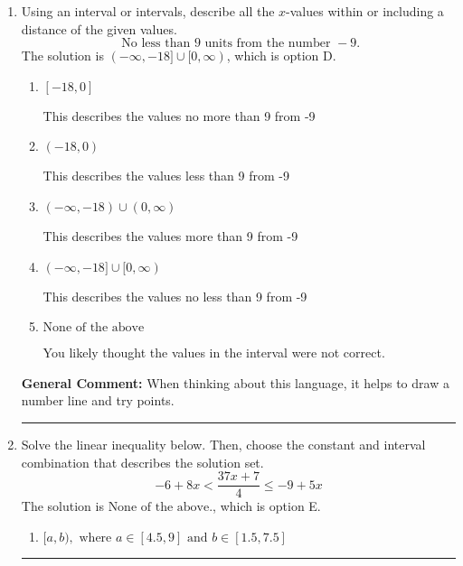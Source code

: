 \documentclass{extbook}[14pt]
\newcommand{\litem}[1]{\item #1

\rule{\textwidth}{0.4pt}}
\begin{document}
\begin{enumerate}
{\begin{enumerate}[label=\Alph*.]
$(-\infty, 10.00) \cup [-4.00, \infty)$, which corresponds to displaying the and-inequality as an or-inequality and getting negatives of the actual endpoints.
\item \( (-\infty, a] \cup (b, \infty), \text{ where } a \in [6.75, 15] \text{ and } b \in [-9.75, -1.5] \)

$(-\infty, 10.00] \cup (-4.00, \infty)$, which corresponds to displaying the and-inequality as an or-inequality AND flipping the inequality AND getting negatives of the actual endpoints.
\item \( (a, b], \text{ where } a \in [8.25, 15] \text{ and } b \in [-6, -3] \)

$(10.00, -4.00]$, which is the correct interval but negatives of the actual endpoints.
\item \( \text{None of the above.} \)

* This is correct as the answer should be $(-10.00, 4.00]$.
\end{enumerate}

\textbf{General Comment:} To solve, you will need to break up the compound inequality into two inequalities. Be sure to keep track of the inequality! It may be best to draw a number line and graph your solution.
}
\litem{
Using an interval or intervals, describe all the $x$-values within or including a distance of the given values.
\[ \text{ No less than } 9 \text{ units from the number } -9. \]The solution is \( (-\infty, -18] \cup [0, \infty) \), which is option D.\begin{enumerate}[label=\Alph*.]
\item \( [-18, 0] \)

This describes the values no more than 9 from -9
\item \( (-18, 0) \)

This describes the values less than 9 from -9
\item \( (-\infty, -18) \cup (0, \infty) \)

This describes the values more than 9 from -9
\item \( (-\infty, -18] \cup [0, \infty) \)

This describes the values no less than 9 from -9
\item \( \text{None of the above} \)

You likely thought the values in the interval were not correct.
\end{enumerate}

\textbf{General Comment:} When thinking about this language, it helps to draw a number line and try points.
}
\litem{
Solve the linear inequality below. Then, choose the constant and interval combination that describes the solution set.
\[ -6 + 8 x < \frac{37 x + 7}{4} \leq -9 + 5 x \]The solution is \( \text{None of the above.} \), which is option E.\begin{enumerate}[label=\Alph*.]
\item \( [a, b), \text{ where } a \in [4.5, 9] \text{ and } b \in [1.5, 7.5] \)


\end{enumerate}}
\end{enumerate}
\end{document}
